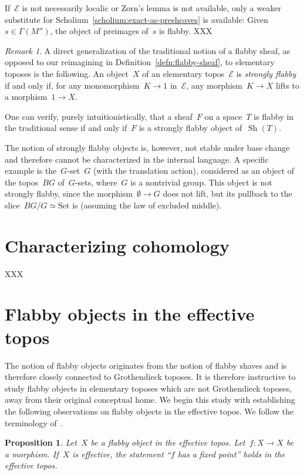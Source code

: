 \documentclass[oneside]{amsart}
\theoremstyle{definition}
\theoremstyle{plain}
\newtheorem{prop}[defn]{Proposition}
\theoremstyle{remark}
\newtheorem{rem}[defn]{Remark}
\newcommand{\E}{\mathcal{E}}
\DeclareMathOperator{\Sh}{Sh}
\newcommand{\Set}{\mathrm{Set}}
\renewcommand{\_}{\mathpunct{.}\,}
\begin{document}
If~$\E$ is not necessarily localic or Zorn's lemma is not available, only a
weaker substitute for Scholium~\ref{scholium:exact-as-presheaves} is available:
Given~$s \in \Gamma(M'')$, the object of preimages of~$s$ is flabby. XXX

\begin{rem}A direct generalization of the traditional notion of a flabby sheaf, as
opposed to our reimagining in Definition~\ref{defn:flabby-sheaf}, to
elementary toposes is the following. An object~$X$ of an elementary topos~$\E$
is \emph{strongly flabby} if and only if, for any monomorphism~$K \to 1$
in~$\E$, any morphism~$K \to X$ lifts to a morphism~$1 \to X$.

One can verify, purely intuitionistically, that a sheaf~$F$ on a space~$T$ is
flabby in the traditional sense if and only if~$F$ is a strongly flabby object
of~$\Sh(T)$.

The notion of strongly flabby objects is, however, not stable under base change
and therefore cannot be characterized in the internal language. A specific
example is the~$G$-set~$G$ (with the translation action), considered as an
object of the topos~$BG$ of~$G$-sets, where~$G$ is a nontrivial group.
This object is not strongly flabby, since the morphism~$\emptyset \to G$ does
not lift, but its pullback to the slice~$BG/G \simeq \Set$ is (assuming
the law of excluded middle).
\end{rem}


\section{Characterizing cohomology}

XXX


\section{Flabby objects in the effective topos}

The notion of flabby objects originates from the notion of flabby shaves and is
therefore closely connected to Grothendieck toposes. It is therefore instructive
to study flabby objects in elementary toposes which are not Grothendieck
toposes, away from their original conceptual home. We begin this study with
establishing the following observations on flabby objects in the effective
topos. We follow the terminology of~\cite{hyland:effective-topos}.

\begin{prop}\label{prop:flabby-effective-sets}
Let~$X$ be a flabby object in the effective topos. Let~$f : X \to X$
be a morphism. If~$X$ is effective, the statement ``$f$ has a fixed point''
holds in the effective topos.
\end{prop}
\end{document}
